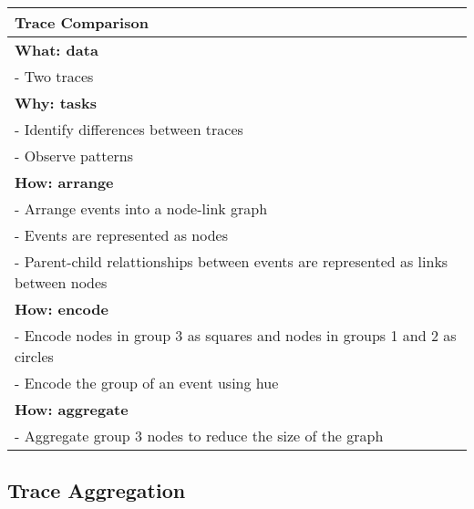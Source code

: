 \begin{center}
    \begin{tabular}{|p{}|}
        \hline
        \textbf{Trace Comparison}                                                           \\
        \hline
        \textbf{What: data}                                                                 \\
        - Two traces                                                                        \\
        \hline
        \textbf{Why: tasks}                                                                 \\
        - Identify differences between traces                                               \\
        - Observe patterns                                                                  \\
        \hline
        \textbf{How: arrange}                                                               \\
        - Arrange events into a node-link graph                                             \\
        - Events are represented as nodes                                                   \\
        - Parent-child relattionships between events are represented as links between nodes \\
        \textbf{How: encode}                                                                \\
        - Encode nodes in group 3 as squares and nodes in groups 1 and 2 as circles         \\
        - Encode the group of an event using hue                                            \\
        \textbf{How: aggregate}                                                             \\
        - Aggregate group 3 nodes to reduce the size of the graph                           \\
        \hline
    \end{tabular}
\end{center}


\subsection{Trace Aggregation}

